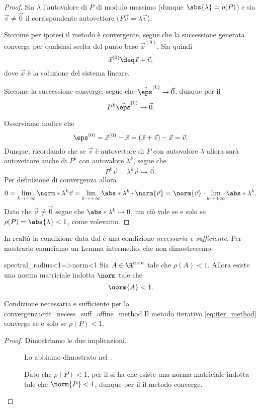 \begin{proof}
    Sia $\lambda$ l'autovalore di $P$ di modulo massimo (dunque $\abs{\lambda} = \rho(P)$) e sia $\vec v \neq \vec 0$ il corrispondente autovettore ($P\vec v = \lambda\vec v$).

    Siccome per ipotesi il metodo è convergente, segue che la successione generata converge per qualsiasi scelta del punto base $\vec x^{(0)}$. Sia quindi \[
        \vec x^{(0)} \deq \vec x + \vec v,
    \] dove $\vec x$ è la soluzione del sistema lineare.

    Siccome la successione converge, segue che $\vec \eps^{(k)} \to \vec 0$, dunque per il  \[
        P^k \vec \eps^{(0)} \to \vec 0.
    \]
    
    Osserviamo inoltre che \[
        \eps^{(0)} = \vec x^{(0)} - \vec x = (\vec x + \vec v) - \vec x = \vec v.
    \] Dunque, ricordando che se $\vec v$ è autovettore di $P$ con autovalore $\lambda$ allora sarà autovettore anche di $P^k$ con autovalore $\lambda^k$, segue che \[
        P^k \vec v = \lambda^k\vec v \to \vec 0. 
    \] Per definizione di convergenza allora \[
        0 
        = \lim_{k \to +\infty} \norm*{\lambda^k\vec v}
        = \lim_{k \to +\infty} \abs*{\lambda^k} \cdot \norm{\vec v} 
        = \norm{\vec v} \cdot \lim_{k \to +\infty} \abs*{\lambda}^k.
    \] Dato che $\vec v \neq \vec 0$ segue che $\abs*{\lambda}^k \to 0$, ma ciò vale se e solo se $\rho(P) = \abs{\lambda} < 1$, come volevamo.
\end{proof}

In realtà la condizione data dal  è una condizione \emph{necessaria e sufficiente}. Per mostrarlo enunciamo un Lemma intermedio, che non dimostreremo.

\begin{lemma}
    {}{spectral_radius<1=>norm<1}
    Sia $A \in \Mat{\R, n, n}$ tale che $\rho(A) < 1$. Allora esiste una norma matriciale indotta $\norm$ tale che \[
        \norm{A} < 1.
    \]
\end{lemma}

\begin{theorem}
    {Condizione necessaria e sufficiente per la convergenza}{crit_necess_suff_affine_method}
    Il metodo iterativo \eqref{eq:iter_method} converge se e solo se $\rho(P) < 1$. 
\end{theorem}
\begin{proof}
    Dimostriamo le due implicazioni.
    \begin{description}
        \item[\boximpl] Lo abbiamo dimostrato nel .
        \item[\boximplby] Dato che $\rho(P) < 1$, per il  si ha che esiste una norma matriciale indotta tale che $\norm{P} < 1$, dunque per il  il metodo converge. \qedhere
    \end{description}
\end{proof}